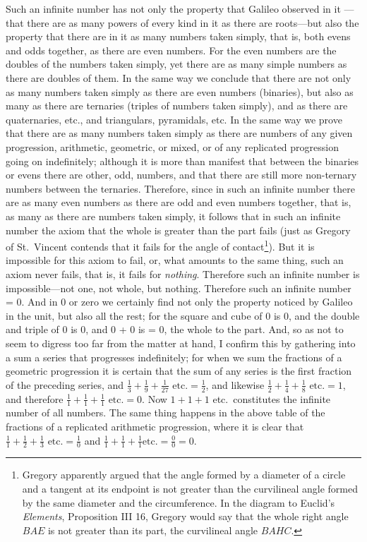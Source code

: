 \documentclass[twoside,openright]{article}
\begin{document}
Such an infinite number has not only the property that Galileo observed in it
---that there are as many powers of every kind in it as there are roots---but also the property that there are in it as many numbers taken simply, that
is, both evens and odds together, as there are even numbers. For the even
numbers are the doubles of the numbers taken simply, yet there are as many
simple numbers as there are doubles of them.  In the same way we conclude that
there are not only as many numbers taken simply as there are even numbers
(binaries), but also as many as there are ternaries (triples of numbers taken
simply), and as there are quaternaries, etc., and triangulars, pyramidals,
etc. In the same way we prove that there are as many numbers taken simply as
there are numbers of any given progression, arithmetic, geometric, or mixed,
or of any replicated progression going on indefinitely; although it is more
than manifest that between the binaries or evens there are other, odd,
numbers, and that there are still more non-ternary numbers between the
ternaries.  Therefore, since in such an infinite number there are as many even
numbers as there are odd and even numbers together, that is, as many as there
are numbers taken simply, it follows that in such an infinite number the axiom
that the whole is greater than the part fails (just as Gregory of St.\ Vincent
contends that it fails for the angle of contact\footnote{Gregory apparently argued that the angle formed by a diameter of a circle and a tangent at its endpoint is not greater than the curvilineal angle formed by the same diameter and the circumference.  In the diagram to Euclid's {\em Elements}, Proposition III 16, Gregory would say that the whole right angle $BAE$ is not greater than its part, the curvilineal angle $BAHC$.}).  But it is impossible for
this axiom to fail, or, what amounts to the same thing, such an axiom never
fails, that is, it fails for {\em nothing}.  Therefore such an infinite number
is impossible---not one, not whole, but nothing.  Therefore such an infinite
number = 0.  And in 0 or zero we certainly find not only the property noticed
by Galileo in the unit, but also all the rest; for the square and cube of 0 is
0, and the double and triple of 0 is 0, and 0 + 0 is = 0, the whole to the
part.  And, so as not to seem to digress too far from the matter at hand, I
confirm this by gathering into a sum a series that progresses indefinitely;
for when we sum the fractions of a geometric progression it is certain that
the sum of any series is the first fraction of the preceding series, and
$\frac{1}{3} + \frac{1}{9} +\frac{1}{27} \mbox{ etc.} = \frac{1}{2}$, and
likewise $\frac{1}{2} + \frac{1}{4} +\frac{1}{8} \mbox{ etc.} = 1$, and
therefore $\frac{1}{1} + \frac{1}{1} +\frac{1}{1} \mbox{ etc.} = 0$.  Now $1 +
1 + 1$ etc.\ constitutes the infinite number of all numbers.  The same thing
happens in the above table of the fractions of a replicated arithmetic
progression, where it is clear that $\frac{1}{1} + \frac{1}{2} +\frac{1}{3}
\mbox{ etc.} = \frac{1}{0}$ and $\frac{1}{1} + \frac{1}{1} +\frac{1}{1} \mbox{
etc.} = \frac{0}{0} = 0$.
\end{document}
